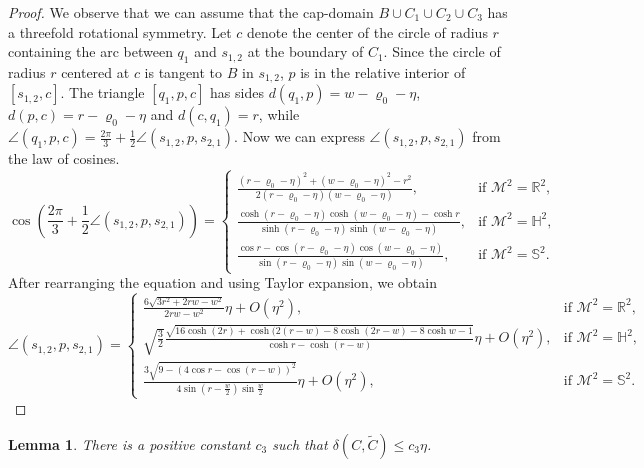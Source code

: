 \documentclass[12pt,reqno]{amsart}
\newtheorem{lemma}[theorem]{Lemma}
\theoremstyle{remark}
\newcommand{\R}{{\mathbb R}}
\newcommand{\hyp}{{\mathbb H}}
\newcommand{\sph}{{\mathbb S}}
\newcommand{\M}{\mathcal{M}}
\begin{document}
\begin{proof}
We observe that we can assume that the cap-domain $B\cup C_1\cup C_2\cup C_3$ has a threefold rotational symmetry. Let $c$ denote the center of the circle of radius $r$ containing the arc between $q_1$ and $s_{1,2}$ at the boundary of $C_1$. Since the circle of radius $r$ centered at $c$ is tangent to $B$ in $s_{1,2}$, $p$ is in the relative interior of $[s_{1,2},c]$. The triangle $[q_1,p,c]$ has sides $d(q_1,p)=w-\varrho_0-\eta$, $d(p,c)=r-\varrho_0-\eta$ and $d(c,q_1)=r$, while $\angle(q_1,p,c)=\frac{2\pi}{3}+\frac{1}{2}\angle(s_{1,2},p,s_{2,1})$. Now we can express $\angle(s_{1,2},p,s_{2,1})$ from the law of cosines.
\[
\cos\left(\frac{2\pi}{3}+\frac{1}{2}\angle(s_{1,2},p,s_{2,1})\right)=
\begin{cases}
\frac{(r-\varrho_0-\eta)^2+(w-\varrho_0-\eta)^2-r^2}{2(r-\varrho_0-\eta)(w-\varrho_0-\eta)}, & \text{if }\M^2=\R^2,\\
\frac{\cosh(r-\varrho_0-\eta)\cosh(w-\varrho_0-\eta)-\cosh r}{\sinh(r-\varrho_0-\eta)\sinh(w-\varrho_0-\eta)}, & \text{if }\M^2=\hyp^2,\\
\frac{\cos r-\cos(r-\varrho_0-\eta)\cos(w-\varrho_0-\eta)}{\sin(r-\varrho_0-\eta)\sin(w-\varrho_0-\eta)}, & \text{if }\M^2=\sph^2.
\end{cases}
\]
After rearranging the equation and using Taylor expansion, we obtain
\[
\angle(s_{1,2},p,s_{2,1})=
\begin{cases}
\frac{6\sqrt{3r^2+2rw-w^2}}{2rw-w^2}\eta+O(\eta^2), & \text{if }\M^2=\R^2,\\
\sqrt{\frac{3}{2}}\frac{\sqrt{16\cosh(2r)+\cosh(2(r-w)-8\cosh(2r-w)-8\cosh w-1}}{\cosh r-\cosh(r-w)}\eta+O(\eta^2), & \text{if }\M^2=\hyp^2,\\
\frac{3\sqrt{9-(4\cos r-\cos(r-w))^2}}{4\sin\left(r-\frac{w}{2}\right)\sin\frac{w}{2}}\eta+O(\eta^2), & \text{if }\M^2=\sph^2.
\end{cases}
\]
\end{proof}

\begin{lemma}\label{lem:distance-of-capdomains}
There is a positive constant $c_3$ such that $\delta(C,\widetilde{C})\leq c_3\eta$.
\end{lemma}
\end{document}
